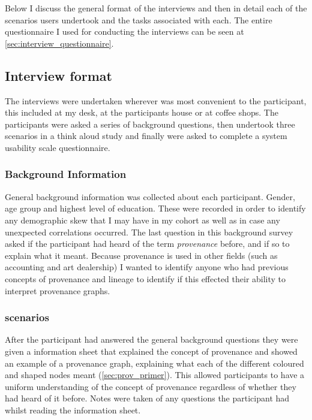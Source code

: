 Below I discuss the general format of the interviews and then in detail each of the scenarios users undertook and the tasks associated with each. The entire questionnaire I used for conducting the interviews can be seen at \ref{sec:interview_questionnaire}.


\subsection{Interview format}

The interviews were undertaken wherever was most convenient to the participant, this included at my desk, at the participants house or at coffee shops. The participants were asked a series of background questions, then undertook three scenarios in a think aloud study and finally were asked to complete a system usability scale questionnaire.

\subsubsection{Background Information}
\label{sec:background_information}

General background information was collected about each participant. Gender, age group and highest level of education. These were recorded in order to identify any demographic skew that I may have in my cohort as well as in case any unexpected correlations occurred. The last question in this background survey asked if the participant had heard of the term \textit{provenance} before, and if so to explain what it meant. Because provenance is used in other fields (such as accounting and art dealership) I wanted to identify anyone who had previous concepts of provenance and lineage to identify if this effected their ability to interpret provenance graphs.

\subsubsection{scenarios}

After the participant had answered the general background questions they were given a information sheet that explained the concept of provenance and showed an example of a provenance graph, explaining what each of the different coloured and shaped nodes meant (\ref{sec:prov_primer}). This allowed participants to have a uniform understanding of the concept of provenance regardless of whether they had heard of it before. Notes were taken of any questions the participant had whilst reading the information sheet.

